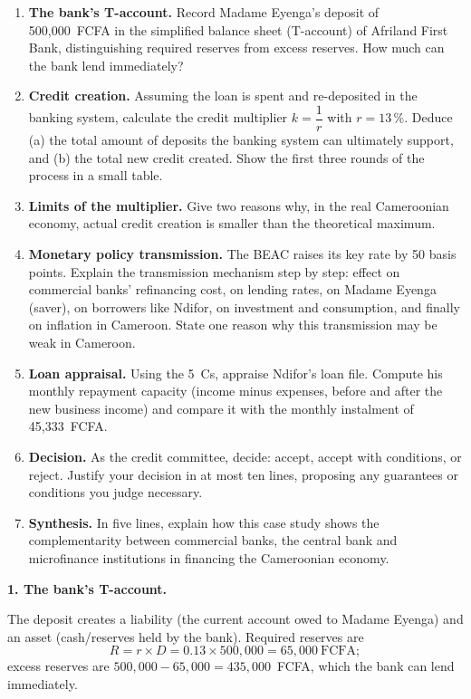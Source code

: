 \documentclass[11pt]{article}
\newcounter{popsec}
\newcounter{popsub}
\newcommand{\courssub}[1]{%
  \stepcounter{popsub}%
  \par\vspace{9pt}\noindent{\popxbold\fontsize{11.5}{13}\selectfont\color{popink}{\color{poporange}\thepopsec.\thepopsub}\hspace{6pt}#1}\par\nopagebreak\vspace{4pt}
}
\begin{document}
\begin{enumerate}
\item \textbf{The bank's T-account.} Record Madame Eyenga's deposit of 500,000~FCFA in the simplified balance sheet (T-account) of Afriland First Bank, distinguishing required reserves from excess reserves. How much can the bank lend immediately?
\item \textbf{Credit creation.} Assuming the loan is spent and re-deposited in the banking system, calculate the credit multiplier $k = \dfrac{1}{r}$ with $r = 13\,\%$. Deduce (a) the total amount of deposits the banking system can ultimately support, and (b) the total new credit created. Show the first three rounds of the process in a small table.
\item \textbf{Limits of the multiplier.} Give two reasons why, in the real Cameroonian economy, actual credit creation is smaller than the theoretical maximum.
\item \textbf{Monetary policy transmission.} The BEAC raises its key rate by 50 basis points. Explain the transmission mechanism step by step: effect on commercial banks' refinancing cost, on lending rates, on Madame Eyenga (saver), on borrowers like Ndifor, on investment and consumption, and finally on inflation in Cameroon. State one reason why this transmission may be weak in Cameroon.
\item \textbf{Loan appraisal.} Using the 5~Cs, appraise Ndifor's loan file. Compute his monthly repayment capacity (income minus expenses, before and after the new business income) and compare it with the monthly instalment of 45,333~FCFA.
\item \textbf{Decision.} As the credit committee, decide: accept, accept with conditions, or reject. Justify your decision in at most ten lines, proposing any guarantees or conditions you judge necessary.
\item \textbf{Synthesis.} In five lines, explain how this case study shows the complementarity between commercial banks, the central bank and microfinance institutions in financing the Cameroonian economy.
\end{enumerate}

\courssub{Model answer}

\textbf{1. The bank's T-account.}\par
The deposit creates a liability (the current account owed to Madame Eyenga) and an asset (cash/reserves held by the bank). Required reserves are
\[ R = r \times D = 0.13 \times 500{,}000 = 65{,}000\ \text{FCFA}; \]
excess reserves are $500{,}000 - 65{,}000 = 435{,}000$~FCFA, which the bank can lend immediately.
\end{document}
